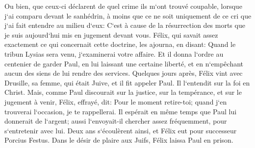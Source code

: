 \verse Ou bien, que ceux-ci déclarent de quel crime ils m`ont trouvé coupable, lorsque j`ai comparu devant le sanhédrin, 
\verse à moins que ce ne soit uniquement de ce cri que j`ai fait entendre au milieu d`eux: C`est à cause de la résurrection des morts que je suis aujourd`hui mis en jugement devant vous. 
\verse Félix, qui savait assez exactement ce qui concernait cette doctrine, les ajourna, en disant: Quand le tribun Lysias sera venu, j`examinerai votre affaire. 
\verse Et il donna l`ordre au centenier de garder Paul, en lui laissant une certaine liberté, et en n`empêchant aucun des siens de lui rendre des services. 
\verse Quelques jours après, Félix vint avec Drusille, sa femme, qui était Juive, et il fit appeler Paul. Il l`entendit sur la foi en Christ. 
\verse Mais, comme Paul discourait sur la justice, sur la tempérance, et sur le jugement à venir, Félix, effrayé, dit: Pour le moment retire-toi; quand j`en trouverai l`occasion, je te rappellerai. 
\verse Il espérait en même temps que Paul lui donnerait de l`argent; aussi l`envoyait-il chercher assez fréquemment, pour s`entretenir avec lui. 
\verse Deux ans s`écoulèrent ainsi, et Félix eut pour successeur Porcius Festus. Dans le désir de plaire aux Juifs, Félix laissa Paul en prison. 

